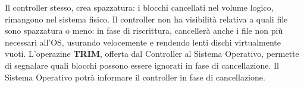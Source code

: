 \documentclass{report}
\begin{document}
Il controller stesso, crea spazzatura: i blocchi cancellati nel volume logico, rimangono nel sistema fisico. Il controller non ha visibilità relativa a quali file sono spazzatura o meno: in fase di riscrittura, cancellerà anche i file non più necessari all'OS, usurando velocemente e rendendo lenti dischi virtualmente vuoti.
L'operazine \textbf{TRIM}, offerta dal Controller al Sistema Operativo, permette di segnalare quali blocchi possono essere ignorati in fase di cancellazione. Il Sistema Operativo potrà informare il controller in fase di cancellazione.
\end{document}
